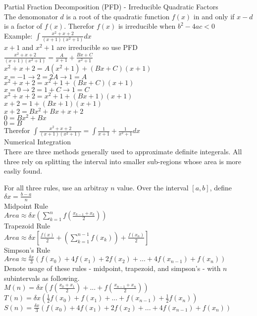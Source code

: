 \documentclass{article}
\begin{document}
\noindent
\Large
Partial Fraction Decomposition (PFD) - Irreducible Quadratic Factors\\
\normalsize
\indent
The denomonator $d$ is a root of the quadratic function $f(x)$ in and only if $x-d$ is a factor of $f(x)$. Therefor $f(x)$ is irreducible when $b^2 - 4ac < 0$\\
Example: $\int{\frac{x^2 + x + 2}{(x + 1)(x^2 + 1)}}dx$\\
$x + 1$ and $x^2 + 1$ are irreducible so use PFD\\
$\frac{x^2 + x + 2}{(x + 1)(x^2 + 1)} = \frac{A}{x+1} + \frac{Bx + C}{x^2 + 1}$\\
$x^2 + x + 2 = A(x^2 + 1) + (Bx + C)(x + 1)$\\
$x = -1 \to 2 = 2A \to 1 = A$\\
$x^2 + x + 2 = x^2 + 1 + (Bx + C)(x + 1)$\\
$x = 0 \to 2 = 1 + C \to 1 = C$\\
$x^2 + x + 2 = x^2 + 1 + (Bx + 1)(x + 1)$\\
$x + 2 = 1 + (Bx + 1)(x + 1)$\\
$x + 2 = Bx^2 + Bx + x + 2$\\
$0 = Bx^2 + Bx$\\
$0 = B$\\
Therefor $\int{\frac{x^2 + x + 2}{(x + 1)(x^2 + 1)}} = \int{\frac{1}{x + 1} + \frac{1}{x^2 + 1}}dx$\\

\noindent
\Large
Numerical Integration\\
\normalsize
\indent
There are three methods generally used to approximate definite integerals. All three rely on splitting the interval into smaller sub-regions whose area is more easliy found.

For all three rules, use an arbitray $n$ value. Over the interval $[a, b]$, define $\delta x = \frac{b - a}{n}$\\
Midpoint Rule\\
$Area \approx \delta x (\sum_{k=1}^{n} f(\frac{x_{k-1} + x_k}{2}))$\\
Trapezoid Rule\\
$Area \approx \delta x [\frac{f(x)}{2} + (\sum_{k=1}^{n-1} f(x_k)) + \frac{f(x_n)}{2}]$\\
Simpson's Rule\\
$Area \approx \frac{\delta x}{3}(f(x_0) + 4f(x_1) + 2f(x_2) + ... + 4f(x_{n-1}) + f(x_n))$\\

Denote usage of these rules - midpoint, trapezoid, and simpson's - with $n$ subintervals as following.\\
$M(n) = \delta x(f(\frac{x_0 + x_1}{2}) + ... + f(\frac{x_{n-1} + x_n}{2}))$\\
$T(n) = \delta x(\frac{1}{2} f(x_0) + f(x_1) + ... + f(x_{n-1}) + \frac{1}{2} f(x_n))$\\
$S(n) = \frac{\delta x}{3}(f(x_0) + 4f(x_1) + 2f(x_2) + ... + 4f(x_{n-1}) + f(x_n))$\\
\end{document}
